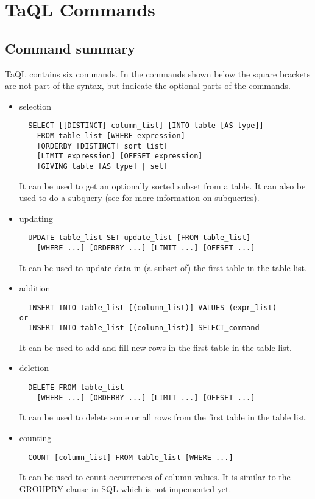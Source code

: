 \section{TaQL Commands}
\subsection{Command summary}
TaQL contains six commands.
In the commands shown below the square brackets are not part of the
syntax, but indicate the optional parts of the commands.

\begin{itemize}
\item selection
\begin{verbatim}
  SELECT [[DISTINCT] column_list] [INTO table [AS type]]
    FROM table_list [WHERE expression]
    [ORDERBY [DISTINCT] sort_list]
    [LIMIT expression] [OFFSET expression]
    [GIVING table [AS type] | set]
\end{verbatim}
It can be used to get an optionally sorted subset from a table. It can
also be used to do a subquery (see  
for more information on subqueries).

\item updating
\begin{verbatim}
  UPDATE table_list SET update_list [FROM table_list]
    [WHERE ...] [ORDERBY ...] [LIMIT ...] [OFFSET ...]
\end{verbatim}
It can be used to update data in (a subset of) the first table in the
table list. 

\item addition
\begin{verbatim}
  INSERT INTO table_list [(column_list)] VALUES (expr_list)
or
  INSERT INTO table_list [(column_list)] SELECT_command
\end{verbatim}
It can be used to add and fill new rows in the first table in the
table list.

\item deletion
\begin{verbatim}
  DELETE FROM table_list
    [WHERE ...] [ORDERBY ...] [LIMIT ...] [OFFSET ...]
\end{verbatim}
It can be used to delete some or all rows from the first table
in the table list.

\item counting
\begin{verbatim}
  COUNT [column_list] FROM table_list [WHERE ...]
\end{verbatim}
It can be used to count occurrences of column values. It is similar to
the GROUPBY clause in SQL which is not impemented yet.


\end{itemize}
